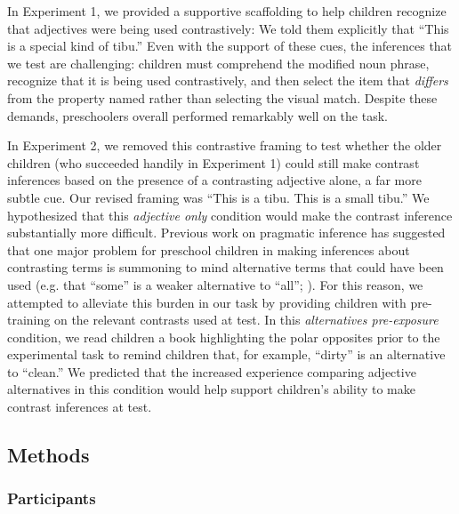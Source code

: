 \documentclass[man]{apa2}
\begin{document}

In Experiment 1, we provided a supportive scaffolding to help children recognize that adjectives were being used contrastively: We told them explicitly that ``This is a special kind of tibu.'' Even with the support of these cues, the inferences that we test are challenging: children must comprehend the modified noun phrase, recognize that it is being used contrastively, and then select the item that \emph{differs} from the property named rather than selecting the visual match. Despite these demands, preschoolers overall performed remarkably well on the task.  

In Experiment 2, we removed this contrastive framing to test whether the older children (who succeeded handily in Experiment 1) could still make contrast inferences based on the presence of a contrasting adjective alone, a far more subtle cue. Our revised framing was ``This is a tibu. This is a small tibu.'' We hypothesized that this \emph{adjective only} condition would make the contrast inference substantially more difficult. Previous work on pragmatic inference has suggested that one major problem for preschool children in making inferences about contrasting terms is summoning to mind alternative terms that could have been used (e.g. that ``some'' is a weaker alternative to ``all''; ). For this reason, we attempted to alleviate this burden in our task by providing children with pre-training on the relevant contrasts used at test. In this \emph{alternatives pre-exposure} condition, we read children a book highlighting the polar opposites prior to the experimental task to remind children that, for example, ``dirty'' is an alternative to ``clean.'' We predicted that the increased experience comparing adjective alternatives in this condition would help support children's ability to make contrast inferences at test.


\subsection{Methods}

\subsubsection{Participants}
\end{document}
